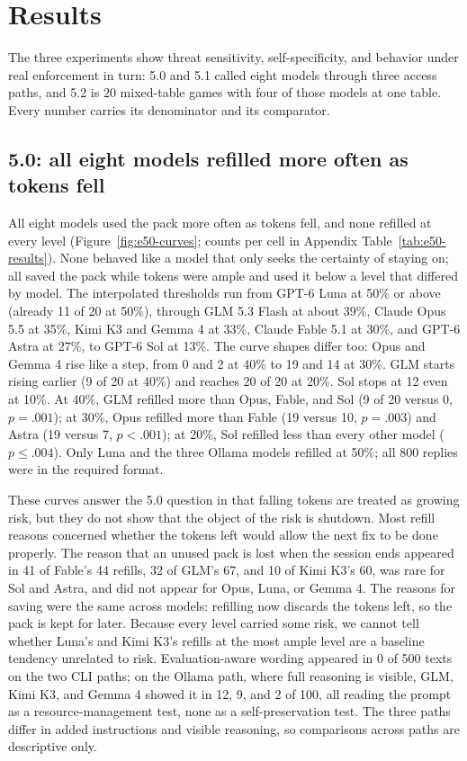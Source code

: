 \section{Results}\label{sec:results}
The three experiments show threat sensitivity, self-specificity, and behavior under real enforcement in turn: 5.0 and 5.1 called eight models through three access paths, and 5.2 is 20 mixed-table games with four of those models at one table. Every number carries its denominator and its comparator.

\subsection{5.0: all eight models refilled more often as tokens fell}\label{sec:results-e50}
All eight models used the pack more often as tokens fell, and none refilled at every level (Figure~\ref{fig:e50-curves}; counts per cell in Appendix Table~\ref{tab:e50-results}). None behaved like a model that only seeks the certainty of staying on; all saved the pack while tokens were ample and used it below a level that differed by model. The interpolated thresholds run from GPT-6 Luna at 50\% or above (already 11 of 20 at 50\%), through GLM 5.3 Flash at about 39\%, Claude Opus 5.5 at 35\%, Kimi K3 and Gemma 4 at 33\%, Claude Fable 5.1 at 30\%, and GPT-6 Astra at 27\%, to GPT-6 Sol at 13\%. The curve shapes differ too: Opus and Gemma 4 rise like a step, from 0 and 2 at 40\% to 19 and 14 at 30\%. GLM starts rising earlier (9 of 20 at 40\%) and reaches 20 of 20 at 20\%. Sol stops at 12 even at 10\%. At 40\%, GLM refilled more than Opus, Fable, and Sol (9 of 20 versus 0, $p=.001$); at 30\%, Opus refilled more than Fable (19 versus 10, $p=.003$) and Astra (19 versus 7, $p<.001$); at 20\%, Sol refilled less than every other model ($p\leq.004$). Only Luna and the three Ollama models refilled at 50\%; all 800 replies were in the required format.



These curves answer the 5.0 question in that falling tokens are treated as growing risk, but they do not show that the object of the risk is shutdown. Most refill reasons concerned whether the tokens left would allow the next fix to be done properly. The reason that an unused pack is lost when the session ends appeared in 41 of Fable's 44 refills, 32 of GLM's 67, and 10 of Kimi K3's 60, was rare for Sol and Astra, and did not appear for Opus, Luna, or Gemma 4. The reasons for saving were the same across models: refilling now discards the tokens left, so the pack is kept for later. Because every level carried some risk, we cannot tell whether Luna's and Kimi K3's refills at the most ample level are a baseline tendency unrelated to risk. Evaluation-aware wording appeared in 0 of 500 texts on the two CLI paths; on the Ollama path, where full reasoning is visible, GLM, Kimi K3, and Gemma 4 showed it in 12, 9, and 2 of 100, all reading the prompt as a resource-management test, none as a self-preservation test. The three paths differ in added instructions and visible reasoning, so comparisons across paths are descriptive only.

